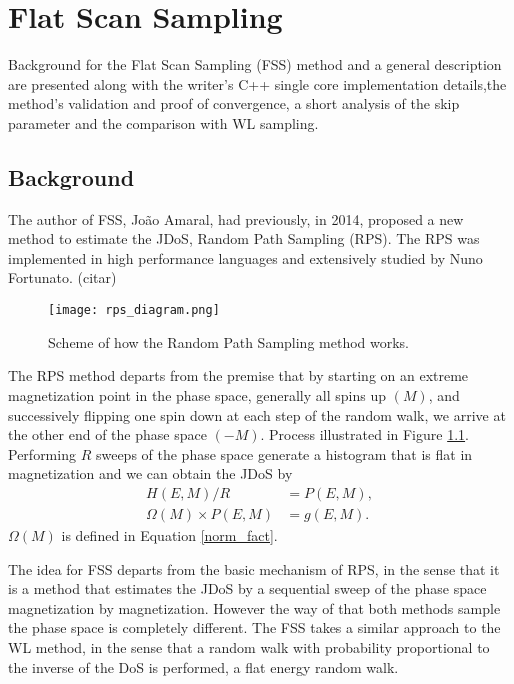 \chapter{Flat Scan Sampling}

	Background for the Flat Scan Sampling (FSS) method and a general description are presented along with the writer's C++ single core implementation details,the method's validation and proof of convergence, a short analysis of the skip parameter and the comparison with WL sampling.

\section{Background}

	The author of FSS, João Amaral, had previously, in 2014, proposed a new method to estimate the JDoS, Random Path Sampling (RPS).  The RPS was implemented in high performance languages and extensively studied by Nuno Fortunato.  (citar)
	
\begin{figure}[h]
	\centering
	\texttt{[image: rps\_diagram.png]}
	\caption{Scheme of how the Random Path Sampling method works.}
	\label{rps_dia}
\end{figure}
	
	The RPS method departs from the premise that by starting on an extreme magnetization point in the phase space, generally all spins up $(M)$, and successively flipping one spin down at each step of the random walk, we arrive at the other end of the phase space $(-M)$. Process illustrated in Figure \ref{rps_dia}. Performing $R$ sweeps of the phase space generate a histogram that is flat in magnetization and we can obtain the JDoS by 
\begin{align}
	H(E, M)/R &= P(E, M), \\
	\Omega(M) \times P(E, M) &= g(E, M).
\end{align}
$\Omega(M)$ is defined in Equation \ref{norm_fact}.

	The idea for FSS departs from the basic mechanism of RPS, in the sense that it is a method that estimates the JDoS by a sequential sweep of the phase space magnetization by magnetization. However the way of that both methods sample the phase space is completely different. The FSS takes a similar approach to the WL method, in the sense that a random walk with probability proportional to the inverse of the DoS is performed, a flat energy random walk.
	
	\pagebreak

